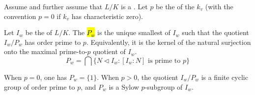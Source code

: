 \begin{definition} \label{definition:wild_inertia_group_of_a_finite_galois_extension_of_valuation_fields}
    Assume  and further assume that $L/K$ is a  . Let $p$ be the  of the  $k_v$ (with the convention $p = 0$ if $k_v$ has characteristic zero).

    Let $I_w$ be the  of $L/K$.
    The  \hl{$P_w$} is the unique smallest  of $I_w$ such that the quotient $I_w/P_w$ has order prime to $p$.
    Equivalently, it is the kernel of the natural surjection onto the maximal prime-to-$p$ quotient of $I_w$.
    $$P_w = \bigcap \{N \triangleleft I_w : [I_w:N] \text{ is prime to } p\}$$

    When $p = 0$, one has $P_w = \{1\}$. When $p > 0$, the quotient $I_w/P_w$ is a finite cyclic group of order prime to $p$, and $P_w$ is a Sylow $p$-subgroup of $I_w$.
\end{definition}
